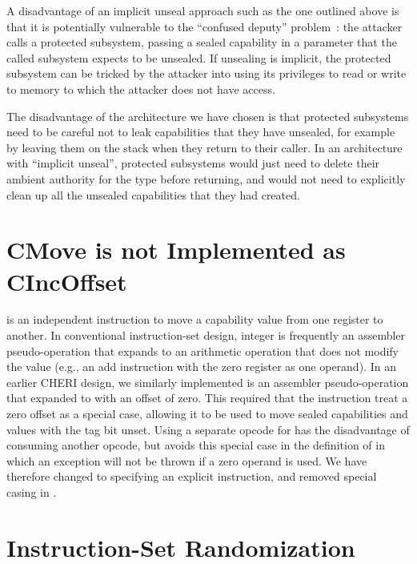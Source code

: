 A disadvantage of an implicit unseal approach such as the one outlined above
is that it is potentially vulnerable to the ``confused deputy''
problem~\cite{Hardy1988}: the attacker calls a protected subsystem, passing
a sealed capability in a parameter that the called subsystem expects to be
unsealed. If unsealing is implicit, the protected subsystem can be tricked
by the attacker into using its privileges to read or write to memory to
which the attacker does not have access.

The disadvantage of the architecture we have chosen is that protected subsystems
need to be careful not to leak capabilities that they have unsealed, for example
by leaving them on the stack when they return to their caller. In an
architecture with ``implicit unseal'', protected subsystems would just need
to delete their ambient authority for the type before returning, and would
not need to explicitly clean up all the unsealed capabilities that they
had created.

\section{CMove is not Implemented as CIncOffset}

 is an independent instruction to move a capability value
from one register to another.
In conventional instruction-set design, integer  is
frequently an assembler pseudo-operation that expands to an arithmetic
operation that does not modify the value (e.g., an add instruction with the
zero register as one operand).
In an earlier CHERI design, we similarly implemented  is an
assembler pseudo-operation that expanded to  with an
offset of zero.
This required that the  instruction treat a zero
offset as a special case, allowing it to be used to move sealed capabilities
and values with the tag bit unset.
Using a separate opcode for  has the disadvantage of
consuming another opcode, but avoids this special case in the definition of
 in which an exception will not be thrown if a zero
operand is used.
We have therefore changed to specifying an explicit 
instruction, and removed special casing in .

\section{Instruction-Set Randomization}

